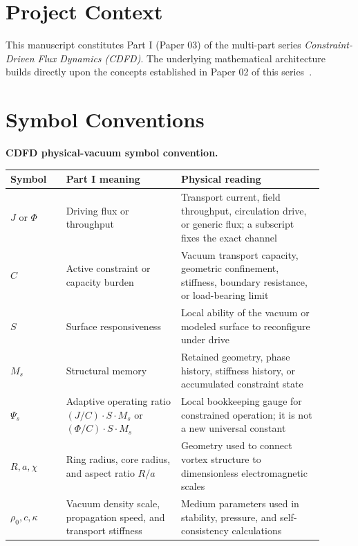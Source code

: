\documentclass[11pt]{article}
\begin{document}
\section*{Project Context}
This manuscript constitutes Part I (Paper 03) of the multi-part series
\textit{Constraint-Driven Flux Dynamics (CDFD)}. The underlying mathematical
architecture builds directly upon the concepts established in Paper 02 of this
series~\cite{MujjabiII2026}.

\section*{Symbol Conventions}

\noindent\textbf{CDFD physical-vacuum symbol convention.}
\begin{center}
{\small
\begin{tabular}{p{0.16\linewidth}p{0.33\linewidth}p{0.41\linewidth}}
\hline
Symbol & Part I meaning & Physical reading \\
\hline
$J$ or $\Phi$ & Driving flux or throughput & Transport current, field throughput, circulation drive, or generic flux; a subscript fixes the exact channel \\
$C$ & Active constraint or capacity burden & Vacuum transport capacity, geometric confinement, stiffness, boundary resistance, or load-bearing limit \\
$S$ & Surface responsiveness & Local ability of the vacuum or modeled surface to reconfigure under drive \\
$M_s$ & Structural memory & Retained geometry, phase history, stiffness history, or accumulated constraint state \\
$\Psi_s$ & Adaptive operating ratio $(J/C)\cdot S\cdot M_s$ or $(\Phi/C)\cdot S\cdot M_s$ & Local bookkeeping gauge for constrained operation; it is not a new universal constant \\
$R,a,\chi$ & Ring radius, core radius, and aspect ratio $R/a$ & Geometry used to connect vortex structure to dimensionless electromagnetic scales \\
$\rho_0,c,\kappa$ & Vacuum density scale, propagation speed, and transport stiffness & Medium parameters used in stability, pressure, and self-consistency calculations \\
\hline
\end{tabular}
}
\end{center}
\end{document}
